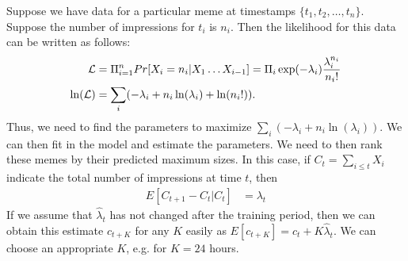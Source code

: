 \documentclass[20pt]{article}
\begin{document}
Suppose we have data for a particular meme at timestamps $\{t_1, t_2, \ldots, t_n\}$. Suppose the number of impressions for $t_i$ is $n_i$. 
Then the likelihood for this data can be written as follows:
\begin{align*}
 {\cal L} & = \Pi_{i=1}^n  Pr[X_i = n_i| X_1\ldots X_{i-1}] = \Pi_i \exp(-\lambda_i) \frac{\lambda_i^{n_i}}{n_i !}\\
 \ln({\cal L}) &=  \sum_i ( - \lambda_i + n_i \ln(\lambda_i) + \ln(n_i!) ) .  
\end{align*}
Thus, we need to find the parameters to maximize $ \sum_i ( - \lambda_i + n_i \ln(\lambda_i))$. 
We can then fit in the model and estimate the parameters. We need to then rank these memes by their
predicted maximum sizes. In this case, if $C_t = \sum_{i\le t} X_i $ indicate the total number of impressions at time $t$, then
\begin{align*}
 E[C_{t+1} - C_t | C_t] & = \lambda_t
\end{align*}
If we assume that $\widehat{\lambda}_t$ has not changed after the training period, then we can obtain this estimate $c_{t+K}$ for any $K$ easily
as $E[c_{t+K}] = c_t + K \widehat{\lambda}_t $. We can choose an appropriate $K$, e.g. for $K=24$ hours.  






 
 
\end{document}
